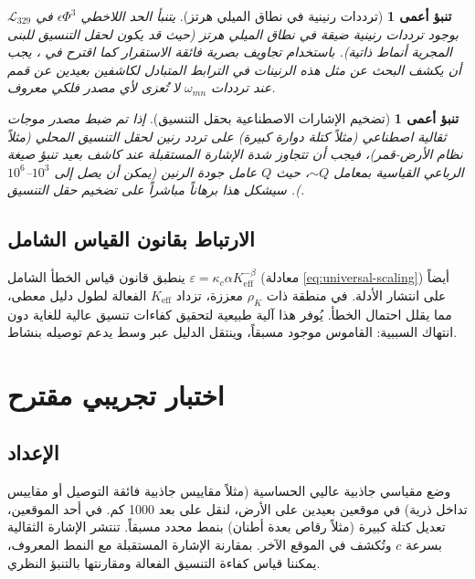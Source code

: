\documentclass[11pt,a4paper]{article}
\newcommand{\Keff}{K_{\mathrm{eff}}}
\newcommand{\kappac}{\kappa_c}
\newcommand{\eps}{\varepsilon}
\newtheorem{prediction}[theorem]{تنبؤ أعمى}
\begin{document}
	\begin{prediction}[ترددات رنينية في نطاق الميلي هرتز]
		يتنبأ الحد اللاخطي \(\epsilon \Phi^3\) في \(\mathcal{L}_{329}\) بوجود ترددات رنينية ضيقة في نطاق الميلي هرتز (حيث قد يكون لحقل التنسيق للبنى المجرية أنماط ذاتية). باستخدام تجاويف بصرية فائقة الاستقرار كما اقترح في \cite{Barontini2025}، يجب أن يكشف البحث عن مثل هذه الرنينات في الترابط المتبادل لكاشفين بعيدين عن قمم عند ترددات \(\omega_{mn}\) لا تُعزى لأي مصدر فلكي معروف.
	\end{prediction}
	
	\begin{prediction}[تضخيم الإشارات الاصطناعية بحقل التنسيق]
		إذا تم ضبط مصدر موجات ثقالية اصطناعي (مثلاً كتلة دوارة كبيرة) على تردد رنين لحقل التنسيق المحلي (مثلاً نظام الأرض-قمر)، فيجب أن تتجاوز شدة الإشارة المستقبلة عند كاشف بعيد تنبؤ صيغة الرباعي القياسية بمعامل \(\sim Q\)، حيث \(Q\) عامل جودة الرنين (يمكن أن يصل إلى \(10^3\)–\(10^6\)). سيشكل هذا برهاناً مباشراً على تضخيم حقل التنسيق.
	\end{prediction}
	
	\subsection{الارتباط بقانون القياس الشامل}
	
	ينطبق قانون قياس الخطأ الشامل \(\eps = \kappac\alpha\Keff^{-\beta}\) (معادلة \ref{eq:universal-scaling}) أيضاً على انتشار الأدلة. في منطقة ذات \(\rho_K\) معززة، تزداد \(\Keff\) الفعالة لطول دليل معطى، مما يقلل احتمال الخطأ. يُوفر هذا آلية طبيعية لتحقيق كفاءات تنسيق عالية للغاية دون انتهاك السببية: القاموس موجود مسبقاً، وينتقل الدليل عبر وسط يدعم توصيله بنشاط.
	
	\section{اختبار تجريبي مقترح}
	\label{sec:experiment}
	
	\subsection{الإعداد}
	
	وضع مقياسي جاذبية عاليي الحساسية (مثلاً مقاييس جاذبية فائقة التوصيل أو مقاييس تداخل ذرية) في موقعين بعيدين على الأرض، لنقل على بعد 1000 كم. في أحد الموقعين، تعديل كتلة كبيرة (مثلاً رقاص بعدة أطنان) بنمط محدد مسبقاً. تنتشر الإشارة الثقالية بسرعة \(c\) وتُكشف في الموقع الآخر. بمقارنة الإشارة المستقبلة مع النمط المعروف، يمكننا قياس كفاءة التنسيق الفعالة ومقارنتها بالتنبؤ النظري.
	
\end{document}
